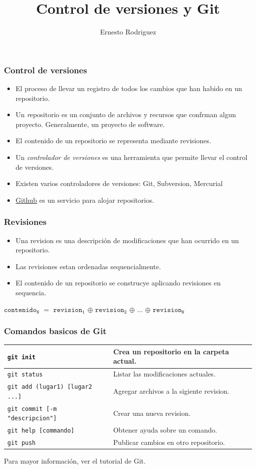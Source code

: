 \documentclass{beamer}
\title[Git]{Control de versiones y Git}
\author{Ernesto Rodriguez}
\institute{
    Universidad del Itsmo \\
    \medskip \textit{erodriguez@unis.edu.gt}
}
\date[\today]{}
\begin{document}
\begin{frame}
\titlepage
\end{frame}

\begin{frame}
\frametitle{Control de versiones}
\begin{itemize}
    \item{El proceso de llevar un registro de todos los cambios que 
    han habido en un repositorio.}
    \item{Un {\emph repositorio} es un conjunto de archivos y recursos
    que confrman algun proyecto. Generalmente, un proyecto de software.}
    \item{El contenido de un repositorio se representa mediante revisiones.}
    \item{Un \emph{controlador de versiones} es una herramienta que permite
    llevar el control de versiones.}
    \item{Existen varios controladores de versiones: Git, Subversion, Mercurial}
    \item{\href{https://github.com/}{Github} es un servicio para alojar repositorios.}
\end{itemize}
\end{frame}

\begin{frame}
\frametitle{Revisiones}
\begin{itemize}
    \item Una revision es una descripci\'on de modificaciones que han ocurrido en un repositorio.
    \item Las revisiones estan ordenadas sequencialmente.
    \item El contenido de un repositorio se construcye aplicando revisiones en sequencia.
\end{itemize}
\begin{center}
$\mathtt{contenido_N}$ $=$ $\mathtt{revision_1}$ $\oplus$ $\mathtt{revision_2}$ $\oplus$ ... $\oplus$ $\mathtt{revision_N}$
\end{center}
\end{frame}

\begin{frame}
\frametitle{Comandos basicos de Git}
\begin{tabular}{|l|p{5cm}|}
    \hline
    \texttt{git init} & {Crea un repositorio en la carpeta actual.} \\
    \hline
    \texttt{git status} & Listar las modificaciones actuales. \\
    \hline
    \texttt{git add (lugar1) [lugar2 ...]} & Agregar archivos a la sigiente revision. \\
    \hline
    \texttt{git commit [-m "descripcion"]} & Crear una nueva revision. \\
    \hline
    \texttt{git help [commando]} & Obtener ayuda sobre un comando. \\
    \hline
    \texttt{git push} & Publicar cambios en otro repositorio. \\
    \hline
\end{tabular}
\newline\newline
Para mayor informaci\'on, ver el tutorial de Git\cite{GitTutorial}.
\end{frame}
\end{document}
